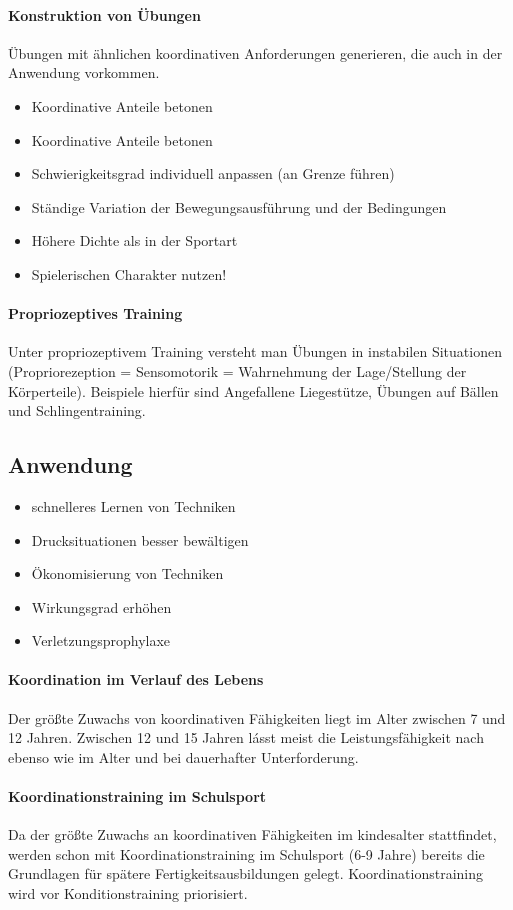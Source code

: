 \paragraph{Konstruktion von Übungen} Übungen mit ähnlichen koordinativen Anforderungen generieren, die auch in der Anwendung vorkommen.
\begin{itemize}
  \item Koordinative Anteile betonen
  \item Koordinative Anteile betonen
  \item Schwierigkeitsgrad individuell anpassen (an Grenze führen)
  \item Ständige Variation der Bewegungsausführung und der Bedingungen
  \item Höhere Dichte als in der Sportart
  \item Spielerischen Charakter nutzen!
\end{itemize}
\paragraph{Propriozeptives Training}
Unter propriozeptivem Training versteht man Übungen in instabilen Situationen (Propriorezeption = Sensomotorik = Wahrnehmung der Lage/Stellung der Körperteile).
Beispiele hierfür sind Angefallene Liegestütze, Übungen auf Bällen und Schlingentraining.

\subsection{Anwendung}
\begin{itemize}
  \item schnelleres Lernen von Techniken
  \item Drucksituationen besser bewältigen
  \item Ökonomisierung von Techniken
  \item Wirkungsgrad erhöhen
  \item Verletzungsprophylaxe
\end{itemize}
\paragraph{Koordination im Verlauf des Lebens} Der größte Zuwachs von koordinativen Fähigkeiten liegt im Alter zwischen 7 und 12 Jahren. Zwischen 12 und 15 Jahren lásst meist die Leistungsfähigkeit nach ebenso wie im Alter und bei dauerhafter Unterforderung.
\paragraph{Koordinationstraining im Schulsport} Da der größte Zuwachs an koordinativen Fähigkeiten im kindesalter stattfindet, werden schon mit Koordinationstraining im Schulsport (6-9 Jahre) bereits die Grundlagen für spätere Fertigkeitsausbildungen gelegt. Koordinationstraining wird vor Konditionstraining priorisiert.
